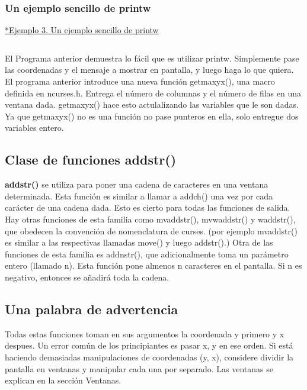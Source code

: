 \documentclass{article}
\begin{document}
\subsubsection{Un ejemplo sencillo de printw}%

\href{https://github.com/nasciiboy/NCURSES-Programming-HOWTO/blob/master/ncurses_programs/basics/printw_example.c}{*Ejemplo 3. Un ejemplo sencillo de printw}
\inputminted{cpp}{./cpp/003_printw.cpp}

El Programa anterior demuestra lo fácil que es utilizar printw. Simplemente
pase las coordenadas y el mensaje a mostrar en pantalla, y luego haga lo que
quiera.\\

El programa anterior introduce una nueva función getmaxyx(), una macro definida
en ncurses.h. Entrega el número de columnas y el número de filas en una ventana
dada. getmaxyx() hace esto actulalizando las variables que le son dadas. Ya que
getmaxyx() no es una función no pase punteros en ella, solo entregue dos
variables entero.

\subsection{Clase de funciones addstr()}%
\textbf{addstr()} se utiliza para poner una cadena de caracteres en una ventana
determinada. Esta función es similar a llamar a addch() una vez por cada
carácter de una cadena dada. Esto es cierto para todas las funciones de salida.
Hay otras funciones de esta familia como mvaddstr(), mvwaddstr() y waddstr(),
que obedecen la convención de nomenclatura de curses. (por ejemplo mvaddstr()
es similar a las respectivas llamadas move() y luego addstr().) Otra de las
funciones de esta familia es addnstr(), que adicionalmente toma un parámetro
entero (llamado n). Esta función pone almenos n caracteres en el pantalla. Si n
es negativo, entonces se añadirá toda la cadena.

\subsection{Una palabra de advertencia}%
Todas estas funciones toman en sus argumentos la coordenada y primero y x
despues. Un error común de los principiantes es pasar x, y en ese orden. Si
está haciendo demasiadas manipulaciones de coordenadas (y, x), considere
dividir la pantalla en ventanas y manipular cada una por separado. Las ventanas
se explican en la sección Ventanas.
\end{document}
